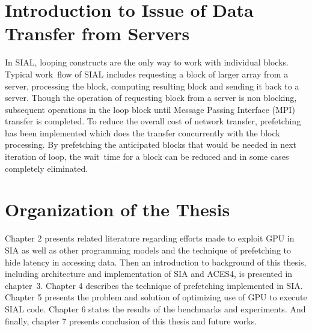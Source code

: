 \section{Introduction to Issue of Data Transfer from Servers}
In SIAL, looping constructs are the only way to work with individual blocks.
Typical work~flow of SIAL includes requesting a block of larger array from a server,
processing the block, computing resulting block and sending it back to a server. Though
the operation of requesting block from a server is non blocking, subsequent operations
in the loop block until Message Passing Interface (MPI) transfer is completed. To reduce the overall cost of network
transfer, prefetching has been implemented which does the transfer concurrently
with the block processing. By prefetching the anticipated blocks that would be
needed in next iteration of loop, the wait~time for a block can be reduced and
in some cases completely eliminated.

\section{Organization of the Thesis}
Chapter 2 presents related literature regarding efforts made to exploit GPU in
SIA as well as other programming models and the technique of prefetching to hide
latency in accessing data. Then an introduction to background of this thesis,
including architecture and implementation of SIA and ACES4, is presented in chapter~3.
Chapter 4 describes the technique of prefetching implemented in SIA. Chapter 5
presents the problem and solution of optimizing use of GPU to execute SIAL
code. Chapter 6 states the results of the benchmarks and experiments. And
finally, chapter 7 presents conclusion of this thesis and future works.